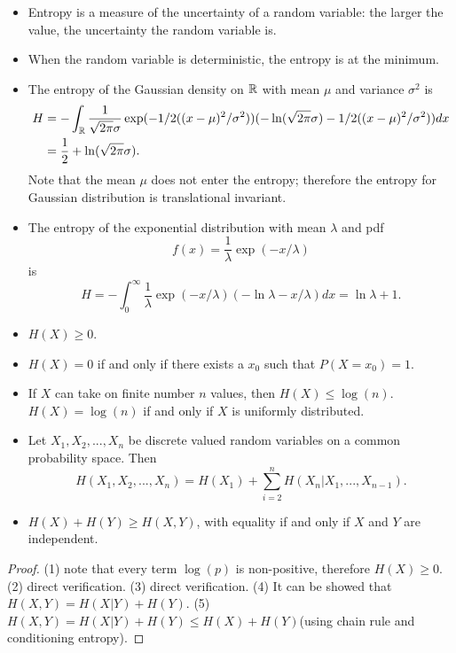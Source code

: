 \begin{refsection}
\begin{definition}
\end{definition}

\begin{remark}\hfill
	\begin{itemize}
		\item Entropy is a measure of the uncertainty of a random variable: the larger the value, the uncertainty the random variable is.
		\item When the random variable is deterministic, the entropy is at the minimum.
	\end{itemize}	
\end{remark}


\begin{example}\hfill
	\begin{itemize}
		\item The entropy of the Gaussian density on $\mathbb{R}$ with mean $\mu$ and variance $\sigma^2$ is
		\begin{align*}
		H &= -\int_{\mathbb{R}} \frac{1}{\sqrt{2\pi}\sigma} \exp(-1/2((x-\mu)^2/\sigma^2))(-\ln(\sqrt{2\pi}\sigma) -1/2((x-\mu)^2/\sigma^2))dx \\
		&= \frac{1}{2} + \ln(\sqrt{2\pi}\sigma).
		\end{align*}
		Note that the mean $\mu$ does not enter the entropy; therefore the entropy for Gaussian distribution is translational invariant.
		\item The entropy of the exponential distribution with mean $\lambda$ and pdf
		$$f(x) = \frac{1}{\lambda}\exp(-x/\lambda)$$
		is
		$$H = -\int_0^\infty \frac{1}{\lambda} \exp(-x/\lambda)(-\ln \lambda -x/\lambda) dx = \ln \lambda + 1.$$
	\end{itemize}	
\end{example}



\begin{lemma}\hfill
	\begin{itemize}
		\item $H(X) \geq 0$.
		\item $H(X) = 0$ if and only if there exists a $x_0$ such that $P(X=x_0) = 1$.
		\item If $X$ can take on finite number $n$ values, then $H(X) \leq \log(n)$. $H(X) = \log(n)$ if and only if $X$ is uniformly distributed. 
		\item Let $X_1,X_2,...,X_n$ be discrete valued random variables on a common probability space. Then
		$$H(X_1,X_2,...,X_n) = H(X_1) + \sum_{i=2}^n H(X_n|X_1,...,X_{n-1}).$$
		\item $H(X) + H(Y) \geq H(X,Y)$, with equality if and only if $X$ and $Y$ are independent.
	\end{itemize}
\end{lemma}
\begin{proof}
	(1) note that every term $\log(p)$ is non-positive, therefore $H(X) \geq 0$. (2) direct verification. (3)  direct verification. (4) It can be showed that $H(X,Y) = H(X|Y) + H(Y)$. (5) $H(X,Y) = H(X|Y) + H(Y) \leq H(X) + H(Y)$(using chain rule and conditioning entropy). 
\end{proof}



\end{refsection}
